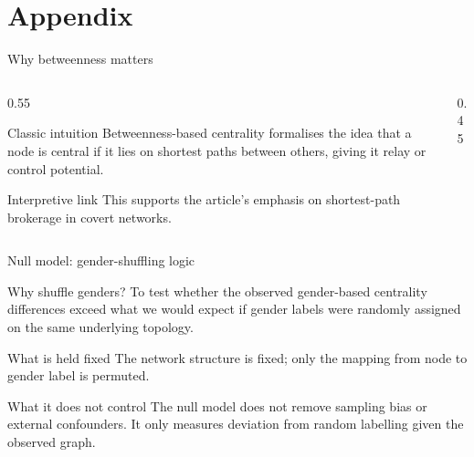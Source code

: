 \appendix
\section{Appendix}

\begin{frame}{Why betweenness matters}
  \begin{columns}[T,onlytextwidth]
    \begin{column}{0.55\textwidth}
      \begin{block}{Classic intuition}
        Betweenness-based centrality formalises the idea that a node is central if it lies on shortest paths between others, giving it relay or control potential.
      \end{block}

      \begin{exampleblock}{Interpretive link}
        This supports the article's emphasis on shortest-path brokerage in covert networks.
      \end{exampleblock}
    \end{column}

    \begin{column}{0.45\textwidth}
      \centering
    \end{column}
  \end{columns}

\end{frame}

\begin{frame}{Null model: gender-shuffling logic}
  \begin{block}{Why shuffle genders?}
    To test whether the observed gender-based centrality differences exceed what we would expect if gender labels were randomly assigned on the same underlying topology.
  \end{block}

  \begin{block}{What is held fixed}
    The network structure is fixed; only the mapping from node to gender label is permuted.
  \end{block}

  \begin{exampleblock}{What it does not control}
    The null model does not remove sampling bias or external confounders. It only measures deviation from random labelling given the observed graph.
  \end{exampleblock}

\end{frame}

